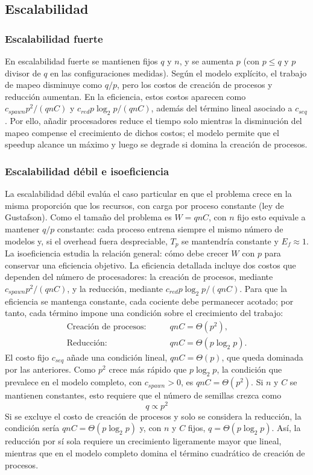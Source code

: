 \documentclass[11pt, a4paper]{article}
\begin{document}
\subsection{Escalabilidad}

\subsubsection{Escalabilidad fuerte}

En escalabilidad fuerte se mantienen fijos $q$ y $n$, y se aumenta $p$ (con $p\le q$ y $p$ divisor de $q$ en las configuraciones medidas). Según el modelo explícito, el trabajo de mapeo disminuye como $q/p$, pero los costos de creación de procesos y reducción aumentan. En la eficiencia, estos costos aparecen como $c_{spawn}p^2/(qnC)$ y $c_{red}p\log_2 p/(qnC)$, además del término lineal asociado a $c_{seq}$. Por ello, añadir procesadores reduce el tiempo solo mientras la disminución del mapeo compense el crecimiento de dichos costos; el modelo permite que el speedup alcance un máximo y luego se degrade si domina la creación de procesos.

\subsubsection{Escalabilidad débil e isoeficiencia}

La escalabilidad débil evalúa el caso particular en que el problema crece en la misma proporción que los recursos, con carga por proceso constante (ley de Gustafson). Como el tamaño del problema es $W=qnC$, con $n$ fijo esto equivale a mantener $q/p$ constante: cada proceso entrena siempre el mismo número de modelos y, si el overhead fuera despreciable, $T_p$ se mantendría constante y $E_f\approx 1$. La isoeficiencia estudia la relación general: cómo debe crecer $W$ con $p$ para conservar una eficiencia objetivo. La eficiencia detallada incluye dos costos que dependen del número de procesadores: la creación de procesos, mediante $c_{spawn}p^2/(qnC)$, y la reducción, mediante $c_{red}p\log_2 p/(qnC)$. Para que la eficiencia se mantenga constante, cada cociente debe permanecer acotado; por tanto, cada término impone una condición sobre el crecimiento del trabajo:
\begin{align*}
\text{Creación de procesos:}\qquad & qnC=\Theta(p^2),\\
\text{Reducción:}\qquad & qnC=\Theta(p\log_2 p).
\end{align*}
El costo fijo $c_{seq}$ añade una condición lineal, $qnC=\Theta(p)$, que queda dominada por las anteriores. Como $p^2$ crece más rápido que $p\log_2 p$, la condición que prevalece en el modelo completo, con $c_{spawn}>0$, es $qnC=\Theta(p^2)$. Si $n$ y $C$ se mantienen constantes, esto requiere que el número de semillas crezca como
\[
q \propto p^2
\]
Si se excluye el costo de creación de procesos y solo se considera la reducción, la condición sería $qnC=\Theta(p\log_2 p)$ y, con $n$ y $C$ fijos, $q=\Theta(p\log_2 p)$. Así, la reducción por sí sola requiere un crecimiento ligeramente mayor que lineal, mientras que en el modelo completo domina el término cuadrático de creación de procesos.
\end{document}
